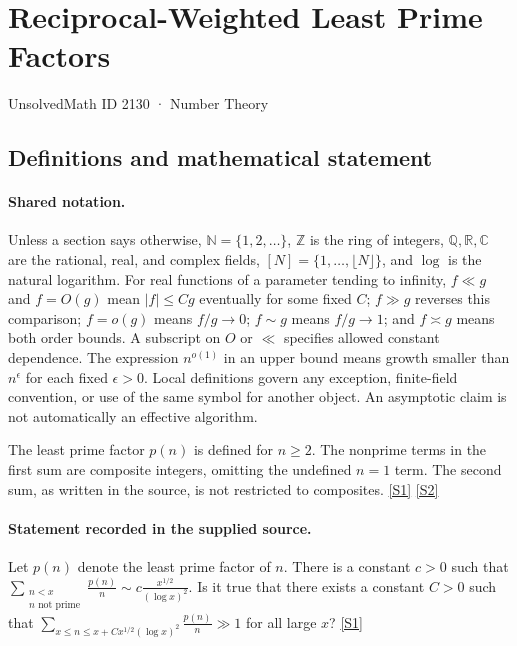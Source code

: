 \documentclass[11pt,a4paper]{article}
\newcommand{\N}{\mathbb{N}}
\newcommand{\Z}{\mathbb{Z}}
\newcommand{\Q}{\mathbb{Q}}
\newcommand{\R}{\mathbb{R}}
\newcommand{\C}{\mathbb{C}}
\newcommand{\sref}[2]{\hyperlink{source:#1:#2}{[S#2]}}
\begin{document}

\setcounter{section}{2129}

\section{Reciprocal-Weighted Least Prime Factors}\label{2130}

{\small\sffamily UnsolvedMath ID 2130 · Number Theory}

\subsection{Definitions and mathematical statement}

\paragraph{Shared notation.}Unless a section says otherwise, $\N=\{1,2,\ldots\}$,
$\Z$ is the ring of integers, $\Q,\R,\C$ are the rational, real, and complex
fields, $[N]=\{1,\ldots,\lfloor N\rfloor\}$, and $\log$ is the natural
logarithm. For real functions of a parameter tending to infinity,
$f\ll g$ and $f=O(g)$ mean $|f|\leq Cg$ eventually for some fixed $C$;
$f\gg g$ reverses this comparison; $f=o(g)$ means $f/g\to0$;
$f\sim g$ means $f/g\to1$; and $f\asymp g$ means both order bounds.
A subscript on $O$ or $\ll$ specifies allowed constant dependence.
The expression $n^{o(1)}$ in an upper bound means growth smaller than
$n^\epsilon$ for each fixed $\epsilon>0$. Local definitions govern any
exception, finite-field convention, or use of the same symbol for another
object. An asymptotic claim is not automatically an effective algorithm.



The least prime factor $p(n)$ is defined for $n\geq2$. The nonprime terms in the first sum are composite integers, omitting the undefined $n=1$ term. The second sum, as written in the source, is not restricted to composites. \sref{2130}{1} \sref{2130}{2}

\paragraph{Statement recorded in the supplied source.}
Let $p(n)$ denote the least prime factor of $n$. There is a constant $c>0$ such that $ \sum_{\substack{n<x\\ n\textrm{ not prime}}}\frac{p(n)}{n}\sim c\frac{x^{1/2}}{(\log x)^2}. $ Is it true that there exists a constant $C>0$ such that $ \sum_{x\leq n\leq x+Cx^{1/2}(\log x)^2}\frac{p(n)}{n} \gg 1 $ for all large $x$? \sref{2130}{1}
\end{document}
